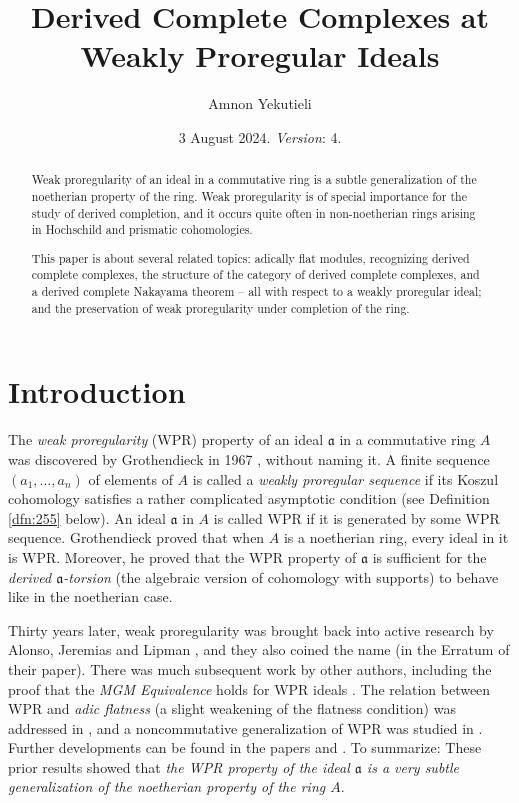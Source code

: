 \documentclass[10pt]{amsart}
\title{Derived Complete Complexes at Weakly Proregular Ideals}
\author{Amnon Yekutieli}
\date{3 August 2024. {\em Version}: 4.}
\theoremstyle{definition}
\numberwithin{equation}{section}
\newcommand{\mfrak}[1]{\mathfrak{#1}}
\renewcommand{\a}{\mfrak{a}}
\begin{document}
\begin{abstract}
Weak proregularity of an ideal in a commutative ring is a subtle
generalization of the noetherian property of the ring.
Weak proregularity is of special importance for the study of derived completion,
and it occurs quite often in non-noetherian rings arising in Hochschild
and prismatic cohomologies.

This paper is about several related topics: adically flat modules,
recognizing derived complete complexes, the structure of the category of derived
complete complexes, and a derived complete Nakayama theorem -- all with
respect to a weakly proregular ideal; and the preservation
of weak proregularity under completion of the ring.
\end{abstract}

\maketitle

\tableofcontents

\setcounter{section}{-1}
\section{Introduction}

The {\em weak proregularity} (WPR) property of an ideal $\a$ in a commutative
ring $A$ was discovered by Grothendieck in 1967 \cite{LC}, without naming it.
A finite sequence $(a_1, \ldots, a_n)$ of elements of $A$ is called a {\em
weakly proregular sequence} if its Koszul cohomology satisfies a rather
complicated asymptotic condition (see Definition \ref{dfn:255} below).
An ideal $\a$ in $A$ is called WPR if it is generated by some WPR sequence.
Grothendieck proved that when $A$ is a noetherian
ring, every ideal in it is WPR. Moreover, he proved that the WPR property of
$\a$ is sufficient for the {\em derived $\a$-torsion} (the algebraic version of
cohomology with supports) to behave like in the noetherian case.

Thirty years later, weak proregularity was brought back into active research
by Alonso, Jeremias and Lipman \cite{AJL}, and they also coined the
name (in the Erratum of their paper). There was much
subsequent work by other authors, including the proof that the {\em
MGM Equivalence} holds for WPR ideals \cite{PSY1}.
The relation between WPR and {\em adic flatness} (a slight
weakening of the flatness condition) was addressed in \cite{Ye4},
and a noncommutative generalization of WPR was studied in \cite{VY}.
Further developments can be found in the papers \cite{Ye6} and \cite{Po2}.
To summarize: These prior results showed that {\em the WPR
property of the ideal $\a$ is a very subtle generalization of the noetherian
property of the ring $A$}.
\end{document}
